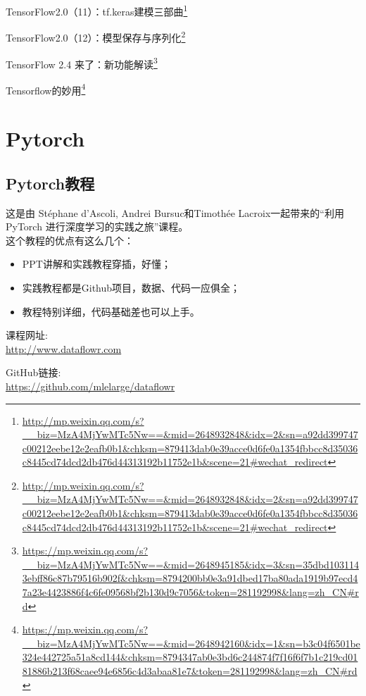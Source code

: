 \documentclass[]{ctexbook}
\renewcommand{\href}[2]{#2\footnote{\url{#1}}}
\begin{document}
\href{http://mp.weixin.qq.com/s?__biz=MzA4MjYwMTc5Nw==\&mid=2648932848\&idx=2\&sn=a92dd399747c00212eebe12e2eafb0b1\&chksm=879413dab0e39acce0d6fe0a1354fbbcc8d35036c8445cd74dcd2db476d44313192b11752e1b\&scene=21\#wechat_redirect}{TensorFlow2.0（11）：tf.keras建模三部曲}

\href{http://mp.weixin.qq.com/s?__biz=MzA4MjYwMTc5Nw==\&mid=2648932848\&idx=2\&sn=a92dd399747c00212eebe12e2eafb0b1\&chksm=879413dab0e39acce0d6fe0a1354fbbcc8d35036c8445cd74dcd2db476d44313192b11752e1b\&scene=21\#wechat_redirect}{TensorFlow2.0（12）：模型保存与序列化}

\href{https://mp.weixin.qq.com/s?__biz=MzA4MjYwMTc5Nw==\&mid=2648945185\&idx=3\&sn=35dbd1031143ebff86c87b79516b902f\&chksm=8794200bb0e3a91dbed17ba80ada1919b97ecd47a23e4423886f4c6fe09568bf2b130d9c7056\&token=281192998\&lang=zh_CN\#rd}{TensorFlow 2.4 来了：新功能解读}

\href{https://mp.weixin.qq.com/s?__biz=MzA4MjYwMTc5Nw==\&mid=2648942160\&idx=1\&sn=b3c04f6501be324e442725a51a8cd144\&chksm=8794347ab0e3bd6c244874f7f16f6f7b1c219cd0181886b213f68caee94e6856c4d3abaa81e7\&token=281192998\&lang=zh_CN\#rd}{Tensorflow的妙用​}

\hypertarget{pytorch}{%
\section{Pytorch}\label{pytorch}}

\hypertarget{pytorchux6559ux7a0b}{%
\subsection{Pytorch教程}\label{pytorchux6559ux7a0b}}

这是由 Stéphane d'Ascoli, Andrei Bursuc和Timothée Lacroix一起带来的``利用 PyTorch 进行深度学习的实践之旅''课程。\\
这个教程的优点有这么几个：

\begin{itemize}
\item
  PPT讲解和实践教程穿插，好懂；
\item
  实践教程都是Github项目，数据、代码一应俱全；
\item
  教程特别详细，代码基础差也可以上手。
\end{itemize}

课程网址:\\
\url{http://www.dataflowr.com}

GitHub链接:\\
\url{https://github.com/mlelarge/dataflowr}
\end{document}
